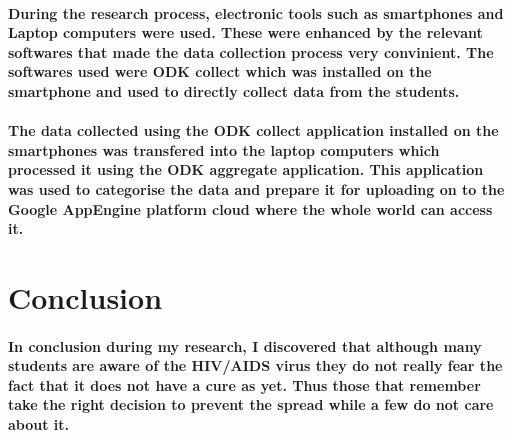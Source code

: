 \documentclass{article}
\begin{document}
\paragraph{During the research process, electronic tools such as smartphones and Laptop computers were used. These were enhanced by the relevant softwares that made the data collection process very convinient. The softwares used were ODK collect which was installed on the smartphone and used to directly collect data from the students. }
\paragraph{The data collected using the ODK collect application installed on the smartphones was transfered into the laptop computers which processed it using the ODK aggregate application. This application was used to categorise the data and prepare it for uploading on to the Google AppEngine platform cloud where the whole world can access it.}

\section {Conclusion}
\paragraph{In conclusion during my research, I discovered that although many students are aware of the HIV/AIDS virus they do not really fear the fact that it does not have a cure as yet. Thus those that remember take the right decision to prevent the spread while a few do not care about it.}
\end{document}
